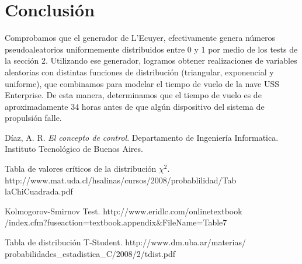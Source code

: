 \documentclass[10pt,journal,compsoc]{IEEEtran}
\begin{document}
\section{Conclusi\'on}
Comprobamos que el generador de L'Ecuyer, efectivamente genera n\'umeros pseudoaleatorios uniformemente distribuidos
entre 0 y 1 por medio de los tests de la secci\'on 2. Utilizando ese generador, logramos obtener realizaciones
de variables aleatorias con distintas funciones de distribuci\'on (triangular, exponencial y uniforme), que combinamos para modelar
el tiempo de vuelo de la nave USS Enterprise. De esta manera, determinamos que el tiempo de vuelo es de aproximadamente 34 horas antes
de que alg\'un dispositivo del sistema de propulsi\'on falle.

\begin{thebibliography}{1}

D\'iaz, A. R. \emph{El concepto de control}. Departamento de Ingenier\'ia Informatica. 
Instituto Tecnol\'ogico de Buenos Aires.

Tabla de valores cr\'iticos de la distribuci\'on $\chi^2$. http://www.mat.uda.cl/hsalinas/cursos/2008/probablilidad/Tab\\laChiCuadrada.pdf

Kolmogorov-Smirnov Test. http://www.eridlc.com/onlinetextbook\\/index.cfm?fuseaction=textbook.appendix\&FileName=Table7

Tabla de distribuci\'on T-Student. http://www.dm.uba.ar/materias/\\probabilidades\_estadistica\_C/2008/2/tdist.pdf

\end{thebibliography}
\end{document}
